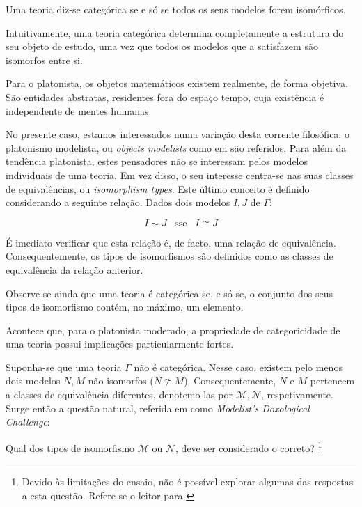 \documentclass{article}
\begin{document}
\vspace{0.5cm}

\begin{dfn}
    Uma teoria diz-se categórica se e só se todos os seus modelos forem isomórficos.
\end{dfn}

\vspace{0.5cm}
Intuitivamente, uma teoria categórica determina completamente a estrutura do seu objeto de estudo, uma vez que todos os modelos que a satisfazem são isomorfos entre si.

\vspace{1cm}

Para o platonista, os objetos matemáticos existem realmente, de forma objetiva. São entidades abstratas, residentes fora do espaço tempo, cuja existência é independente de mentes humanas.

No presente caso, estamos interessados numa variação desta corrente filosófica: o platonismo modelista, ou \textit{objects modelists} como em \cite{buttonwalsh2018} são referidos. Para além da tendência platonista, estes pensadores não se interessam pelos modelos individuais de uma teoria. Em vez disso, o seu interesse centra-se nas suas classes de equivalências, ou \textit{isomorphism types}. Este último conceito é definido considerando a seguinte relação. Dados dois modelos $I,J$ de $\Gamma$:

\begin{equation}
    I \sim J \;\;\; \text{sse}\;\;\; I \cong J
\end{equation}

É imediato verificar que esta relação é, de facto, uma relação de equivalência. Consequentemente, os tipos de isomorfismos são definidos como as classes de equivalência da relação anterior.

\vspace{0.5cm}

Observe-se ainda que uma teoria é categórica se, e só se, o conjunto dos seus tipos de isomorfismo contém, no máximo, um elemento.

\vspace{0.5cm}

Acontece que, para o platonista moderado, a propriedade de categoricidade de uma teoria possui implicações particularmente fortes.

Suponha-se que uma teoria $\Gamma$ não é categórica. Nesse caso, existem pelo menos dois modelos $N,M$ não isomorfos ($N \ncong M$). Consequentemente, $N$ e $M$ pertencem a classes de equivalência diferentes, denotemo-las por $\mathcal{M}, \mathcal{N}$, respetivamente. Surge então a questão natural, referida em \cite{buttonwalsh2018} como \textit{ Modelist’s Doxological Challenge}:
\begin{center}
    Qual dos tipos de isomorfismo $\mathcal{M}$ ou $\mathcal{N}$, deve ser considerado o correto? \footnote{Devido às limitações do ensaio, não é possível explorar algumas das respostas a esta questão. Refere-se o leitor para \cite{buttonwalsh2018}}
\end{center}
\end{document}
